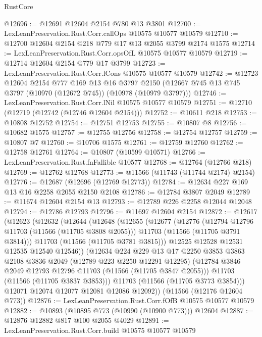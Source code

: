 \begin{lexlean}{RustCore}
\begin{coremodule}
@12696 := @12691 @12604 @2154 @780 @13 @3801
@12700 := LexLeanPreservation.Rust.Corr.callOps @10575 @10577 @10579
@12710 := @12700 @12604 @2154 @218 @779 @17 @13 @2055 @3799 @2174 @1575
@12714 := LexLeanPreservation.Rust.Corr.opsOfL @10575 @10577 @10579
@12719 := @12714 @12604 @2154 @779 @17 @3799
@12723 := LexLeanPreservation.Rust.Corr.lCons @10575 @10577 @10579
@12742 := @12723
    @12604
    @2154
    @777
    @169
    @13
    @16
    @3797
    @2150
    (@12667 @745 @13 @745 @3797 (@10970 (@12672 @745)) (@10978 (@10979 @3797)))
@12746 := LexLeanPreservation.Rust.Corr.lNil @10575 @10577 @10579
@12751 := @12710 (@12719 (@12742 (@12746 @12604 @2154)))
@12752 := @10611 @218
@12753 := @10808 @12752
@12754 := @12751 @12753
@12755 := @10807 @8
@12756 := @10682 @1575
@12757 := @12755 @12756
@12758 := @12754 @12757
@12759 := @10807 @7
@12760 := @10706 @1575
@12761 := @12759 @12760
@12762 := @12758 @12761
@12764 := @10807 (@10599 @10571)
@12766 := LexLeanPreservation.Rust.fnFallible @10577
@12768 := @12764 (@12766 @218)
@12769 := @12762 @12768
@12773 := @11566 (@11743 (@11744 @2174) @2154)
@12776 := @12687 (@12696 (@12769 @12773))
@12784 := @12634 @227 @169 @13 @16 @2258 @2055 @2150 @2108
@12786 := @12784 @3807 @2049
@12789 := @11674 @12604 @2154 @13
@12793 := @12789 @226 @2258 @12044 @12048
@12794 := @12786 @12793
@12796 := @11697 @12604 @2154
@12872 := @12617
    (@12623
      (@12632
        (@12644
          (@12648
            (@12655
              (@12677
                (@12776
                  (@12794 @12796 @11703 (@11566 (@11705 @3808 @2055)))
                  @11703
                  (@11566 (@11705 @3791 @3814)))
                @11703
                (@11566 (@11705 @3781 @3815)))
              @12525
              @12528
              @12531
              @12535
              @12540
              @12546))
          (@12634
            @224
            @229
            @13
            @17
            @2250
            @3853
            @3863
            @2108
            @3836
            @2049
            (@12789 @223 @2250 @12291 @12295)
            (@12784 @3846 @2049 @12793 @12796 @11703 (@11566 (@11705 @3847 @2055)))
            @11703
            (@11566 (@11705 @3837 @3853)))
          @11703
          (@11566 (@11705 @3773 @3854)))
        @12071
        @12074
        @12077
        @12081
        @12086
        @12092))
    (@11566 (@12176 @12604 @773))
@12876 := LexLeanPreservation.Rust.Corr.fOfB @10575 @10577 @10579
@12882 := @10893 (@10895 @773 (@10990 (@10900 @773))) @12604
@12887 := @12876 @12882 @817 @100 @2055 @4029
@12891 := LexLeanPreservation.Rust.Corr.build @10575 @10577 @10579

\end{coremodule}
\end{lexlean}
